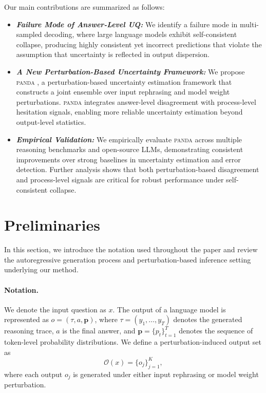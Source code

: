\documentclass{article} %
\DeclareRobustCommand{\method}{%
  \texorpdfstring{%
    \ifmmode\text{\normalfont\textsc{panda}}\else\textsc{panda}\xspace\fi
  }{PANDA}%
}
\begin{document}
Our main contributions are summarized as follows:

\begin{itemize}[leftmargin=*]

\item[\ding{182}] \textit{\textbf{Failure Mode of Answer-Level UQ:}}
We identify a failure mode in multi-sampled decoding, where large language models exhibit self-consistent collapse, producing highly consistent yet incorrect predictions that violate the assumption that uncertainty is reflected in output dispersion.

\item[\ding{183}] \textit{\textbf{A New Perturbation-Based Uncertainty Framework:}}
We propose \method{}, a perturbation-based uncertainty estimation framework that constructs a joint ensemble over input rephrasing and model weight perturbations. \method{} integrates answer-level disagreement with process-level hesitation signals, enabling more reliable uncertainty estimation beyond output-level statistics.

\item[\ding{184}] \textit{\textbf{Empirical Validation:}}
We empirically evaluate \method{} across multiple reasoning benchmarks and open-source LLMs, demonstrating consistent improvements over strong baselines in uncertainty estimation and error detection. Further analysis shows that both perturbation-based disagreement and process-level signals are critical for robust performance under self-consistent collapse.

\end{itemize}

\section{Preliminaries}

In this section, we introduce the notation used throughout the paper and review the autoregressive generation process and perturbation-based inference setting underlying our method.

\paragraph{Notation.}
We denote the input question as $x$. The output of a language model is represented as
$o = (\tau, a, \mathbf{p})$, where $\tau = (y_1, \dots, y_T)$ denotes the generated reasoning trace, $a$ is the final answer, and $\mathbf{p} = \{p_t\}_{t=1}^{T}$ denotes the sequence of token-level probability distributions. We define a perturbation-induced output set as
\[
\mathcal{O}(x) = \{o_j\}_{j=1}^{K},
\]
where each output $o_j$ is generated under either input rephrasing or model weight perturbation.
\end{document}
